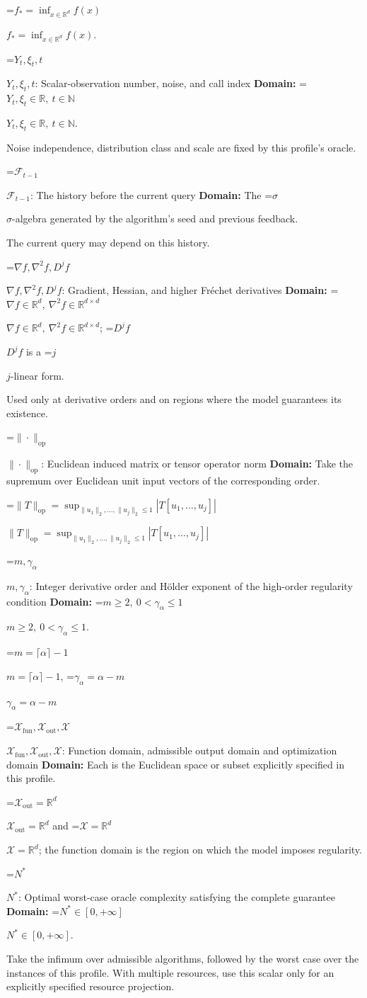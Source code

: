 \documentclass[10pt,a4paper]{article}
\newcommand{\AtlasMath}[1]{\par\begingroup\centering\setbox0=\hbox{$\displaystyle #1$}\ifdim\wd0>1.4\linewidth\typeout{ATLAS WIDE FORMULA: \the\wd0}\fi\ifdim\wd0>\linewidth\resizebox{\linewidth}{!}{\box0}\else\box0\fi\par\endgroup}
\newcommand{\AtlasInlineMath}[1]{\begingroup\setbox0=\hbox{$#1$}\ifdim\wd0>.4\linewidth\endgroup\AtlasMath{#1}\else\endgroup$#1$\fi}
\begin{document}
\AtlasInlineMath{f_*=\inf_{x\in \mathbb{R}^d}f(x)}.

\AtlasInlineMath{Y_t,\xi_t,t}: Scalar-observation number, noise, and call index \textbf{Domain:} \AtlasInlineMath{Y_t,\xi_t\in\mathbb{R},\ t\in\mathbb{N}}.

Noise independence, distribution class and scale are fixed by this profile's oracle.

\AtlasInlineMath{\mathcal{F}_{t-1}}: The history before the current query \textbf{Domain:} The \AtlasInlineMath{\sigma}-algebra generated by the algorithm's seed and previous feedback.

The current query may depend on this history.

\AtlasInlineMath{\nabla f,\nabla^2f,D^jf}: Gradient, Hessian, and higher Fréchet derivatives \textbf{Domain:} \AtlasInlineMath{\nabla f\in\mathbb{R}^d,\ \nabla^2f\in\mathbb{R}^{d\times d}}; \AtlasInlineMath{D^jf} is a \AtlasInlineMath{j}-linear form.

Used only at derivative orders and on regions where the model guarantees its existence.

\AtlasInlineMath{\|\cdot\|_{\mathrm{op}}}: Euclidean induced matrix or tensor operator norm \textbf{Domain:} Take the supremum over Euclidean unit input vectors of the corresponding order.

\AtlasInlineMath{\|T\|_{\mathrm{op}}=\sup_{\|u_1\|_2,\ldots,\|u_j\|_2\le1}|T[u_1,\ldots,u_j]|}

\AtlasInlineMath{m,\gamma_\alpha}: Integer derivative order and Hölder exponent of the high-order regularity condition \textbf{Domain:} \AtlasInlineMath{m\ge2,\ 0<\gamma_\alpha\le1}.

\AtlasInlineMath{m=\lceil\alpha\rceil-1}, \AtlasInlineMath{\gamma_\alpha=\alpha-m}

\AtlasInlineMath{\mathcal{X}_{\mathrm{fun}},\mathcal{X}_{\mathrm{out}},\mathcal{X}}: Function domain, admissible output domain and optimization domain \textbf{Domain:} Each is the Euclidean space or subset explicitly specified in this profile.

\AtlasInlineMath{\mathcal{X}_{\mathrm{out}}=\mathbb{R}^d} and \AtlasInlineMath{\mathcal{X}=\mathbb{R}^d}; the function domain is the region on which the model imposes regularity.

\AtlasInlineMath{N^*}: Optimal worst-case oracle complexity satisfying the complete guarantee \textbf{Domain:} \AtlasInlineMath{N^*\in[0,+\infty]}.

Take the infimum over admissible algorithms, followed by the worst case over the instances of this profile. With multiple resources, use this scalar only for an explicitly specified resource projection.
\end{document}
